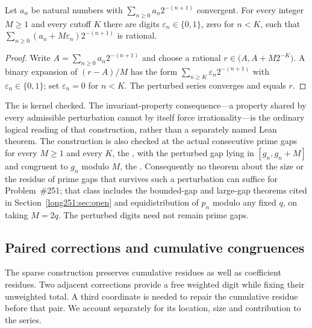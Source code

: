 \documentclass[11pt]{article}
\begin{document}
\begin{theorem}\label{long251:res:boundedperturbation}
Let $a_n$ be natural numbers with $\sum_{n\ge0}a_n2^{-(n+1)}$ convergent.  For
every integer $M\ge1$ and every cutoff $K$ there are digits
$\varepsilon_n\in\{0,1\}$, zero for $n<K$, such that
$\sum_{n\ge0}(a_n+M\varepsilon_n)2^{-(n+1)}$ is rational.
\end{theorem}

\begin{proof}
Write $A=\sum_{n\ge0}a_n2^{-(n+1)}$ and choose a rational
$r\in\bigl(A,A+M2^{-K}\bigr)$.  A binary expansion of $(r-A)/M$ has the form
$\sum_{n\ge K}\varepsilon_n2^{-(n+1)}$ with $\varepsilon_n\in\{0,1\}$; set
$\varepsilon_n=0$ for $n<K$.  The perturbed series converges and equals $r$.
\end{proof}

\noindent The
is kernel checked.  The invariant-property consequence---a property shared by
every admissible perturbation cannot by itself force irrationality---is the
ordinary logical reading of that construction, rather than a separately named
Lean theorem.  The construction is also
checked at the actual consecutive prime gaps for every $M\ge1$ and every $K$,
the
, with the perturbed gap lying in $[g_n,g_n+M]$ and
congruent to $g_n$ modulo $M$, the
.  Consequently no theorem about the size or the residue of prime gaps
that survives such a perturbation can suffice for Problem~\#251; that class
includes the bounded-gap and large-gap theorems cited in
Section~\ref{long251:sec:open} and equidistribution of $p_n$ modulo any fixed $q$, on
taking $M=2q$.  The perturbed digits need not remain prime gaps.

\subsection{Paired corrections and cumulative congruences}
\label{long251:sec:paired-corrections}

The sparse construction preserves cumulative residues as well as coefficient
residues.  Two adjacent corrections provide a free weighted digit while
fixing their unweighted total.  A third coordinate is needed to repair the
cumulative residue before that pair.  We account separately for its location,
size and contribution to the series.
\end{document}

